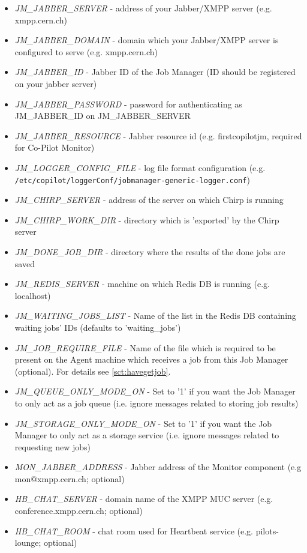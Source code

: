 \begin{itemize}
  \item \emph{JM\_JABBER\_SERVER} - address of your Jabber/XMPP server (e.g. xmpp.cern.ch)
  \item \emph{JM\_JABBER\_DOMAIN} - domain which your Jabber/XMPP server is configured to serve (e.g. xmpp.cern.ch)
  \item \emph{JM\_JABBER\_ID} - Jabber ID of the Job Manager (ID should be registered on your jabber server)
  \item \emph{JM\_JABBER\_PASSWORD} - password for authenticating as JM\_JABBER\_ID on JM\_JABBER\_SERVER
  \item \emph{JM\_JABBER\_RESOURCE} - Jabber resource id (e.g. firstcopilotjm, required for Co-Pilot Monitor)
  \item \emph{JM\_LOGGER\_CONFIG\_FILE} - log file format configuration (e.g. \texttt{/etc/copilot/loggerConf/jobmanager-generic-logger.conf})
  \item \emph{JM\_CHIRP\_SERVER} - address of the server on which Chirp is running
  \item \emph{JM\_CHIRP\_WORK\_DIR} - directory which is 'exported' by the Chirp server
  \item \emph{JM\_DONE\_JOB\_DIR} - directory where the results of the done jobs are saved
  \item \emph{JM\_REDIS\_SERVER} - machine on which Redis DB is running (e.g. localhost)
  \item \emph{JM\_WAITING\_JOBS\_LIST} - Name of the list in the Redis DB containing waiting jobs' IDs (defaults to 'waiting\_jobs')
  \item \emph{JM\_JOB\_REQUIRE\_FILE} - Name of the file which is required to be present on the Agent machine which receives a job from this Job Manager (optional). For details see \ref{sct:havegetjob}.
  \item \emph{JM\_QUEUE\_ONLY\_MODE\_ON} - Set to '1' if you want the Job Manager to only act as a job queue (i.e. ignore messages related to storing job results)
  \item \emph{JM\_STORAGE\_ONLY\_MODE\_ON} - Set to '1' if you want the Job Manager to only act as a storage service (i.e. ignore messages related to requesting new jobs)
  \item \emph{MON\_JABBER\_ADDRESS} - Jabber address of the Monitor component (e.g mon@xmpp.cern.ch; optional)
  \item \emph{HB\_CHAT\_SERVER} - domain name of the XMPP MUC server (e.g. conference.xmpp.cern.ch; optional)
  \item \emph{HB\_CHAT\_ROOM} - chat room used for Heartbeat service (e.g. pilots-lounge; optional)
 \end{itemize}

